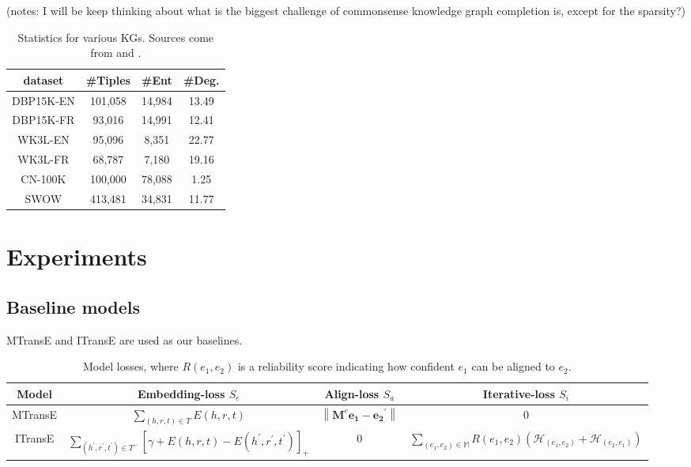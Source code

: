 (notes: I will be keep thinking about what is the biggest challenge of commonsense knowledge graph completion is, except for the sparsity?)
\begin{table}[htb]
    \centering
    \begin{tabular}{c|ccc}
    \hline
           dataset & \#Tiples &\#Ent  &\#Deg.  \\\hline
          DBP15K-EN & 101,058  & 14,984 &  13.49  \\
          DBP15K-FR & 93,016 & 14,991 & 12.41  \\
          WK3L-EN & 95,096 & 8,351 & 22.77  \\
          WK3L-FR & 68,787 & 7,180 & 19.16  \\
          \hline
          CN-100K & 100,000 & 78,088 & 1.25 \\
          SWOW & 413,481 & 34,831 &  11.77\\\hline
    \end{tabular}
    \caption{Statistics for various KGs. Sources come from \cite{Sun2020ABS} and \cite{Malaviya2019ExploitingSA}.}
    \label{tab:comparison-of-different-alignemnt-dataset}
\end{table}

\section{Experiments}
\subsection{Baseline models}
MTransE and ITransE are used as our baselines. 
\begin{table}[!ht]
    \begin{adjustbox}{max width=\textwidth}
    \centering
    \begin{tabular}{c|c|c|c}
          Model &  Embedding-loss $S_e$ & Align-loss $S_a$  & Iterative-loss $S_i$\\\hline
          MTransE &  $\sum\limits_{(h, r, t) \in T} E(h,r,t)$ & $\left\|\mathbf{M}^{e} \mathbf{e_1}-\mathbf{e_2}^{\prime}\right\|$  & 0 \\
          ITransE & $\sum\limits_{\left(h^{\prime}, r^{\prime}, t^{\prime}\right) \in T^{-}}\left[\gamma+E(h, r, t)-E\left(h^{\prime}, r^{\prime}, t^{\prime}\right)\right]_{+}$  & 0 & $\sum\limits_{\left(e_{1}, e_{2}\right) \in \mathbb{M}} R\left(e_{1}, e_{2}\right)\left(\mathcal{H}_{\left(e_{1}, e_{2}\right)}+\mathcal{H}_{\left(e_{2}, e_{1}\right)}\right)$ \\\hline
    \end{tabular}
    \end{adjustbox}
    \caption{Model losses, where $R\left(e_{1}, e_{2}\right)$ is a reliability score indicating how confident $e_1$ can be aligned to $e_2$.}
    \label{tab:model-losses}
\end{table}

